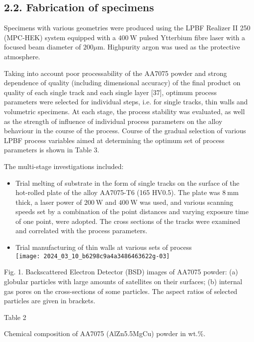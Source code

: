 \documentclass[10pt]{article}
\begin{document}
\subsection*{2.2. Fabrication of specimens}
Specimens with various geometries were produced using the LPBF Realizer II 250 (MPC-HEK) system equipped with a $400 \mathrm{~W}$ pulsed Ytterbium fibre laser with a focused beam diameter of $200 \mu \mathrm{m}$. Highpurity argon was used as the protective atmosphere.

Taking into account poor processability of the AA7075 powder and strong dependence of quality (including dimensional accuracy) of the final product on quality of each single track and each single layer [37], optimum process parameters were selected for individual steps, i.e. for single tracks, thin walls and volumetric specimens. At each stage, the process stability was evaluated, as well as the strength of influence of individual process parameters on the alloy behaviour in the course of the process. Course of the gradual selection of various LPBF process variables aimed at determining the optimum set of process parameters is shown in Table 3.

The multi-stage investigations included:

\begin{itemize}
  \item Trial melting of substrate in the form of single tracks on the surface of the hot-rolled plate of the alloy AA7075-T6 (165 HV0.5). The plate was $8 \mathrm{~mm}$ thick, a laser power of $200 \mathrm{~W}$ and $400 \mathrm{~W}$ was used, and various scanning speeds set by a combination of the point distances and varying exposure time of one point, were adopted. The cross sections of the tracks were examined and correlated with the process parameters.
  \item Trial manufacturing of thin walls at various sets of process\\
\texttt{[image: 2024\_03\_10\_b6298c9a4a3486463622g-03]}
\end{itemize}

Fig. 1. Backscattered Electron Detector (BSD) images of AA7075 powder: (a) globular particles with large amounts of satellites on their surfaces; (b) internal gas pores on the cross-sections of some particles. The aspect ratios of selected particles are given in brackets.

Table 2

Chemical composition of AA7075 (AlZn5.5MgCu) powder in wt.\%.
\end{document}
